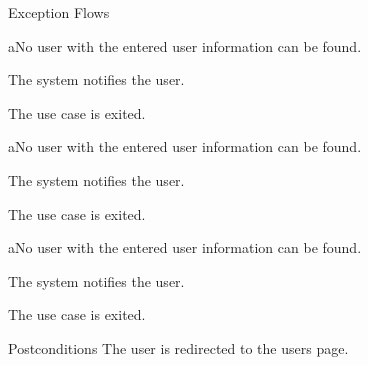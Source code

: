 %
\begin{cpartList}{Exception Flows}
  \begin{innerList}{4}{a}{No user with the entered user information can be found.}
    \item The system notifies the user.
    \item The use case is exited.
  \end{innerList}
  \begin{innerList}{4}{a}{No user with the entered user information can be found.}
    \item The system notifies the user.
    \item The use case is exited.
  \end{innerList}
  \begin{innerList}{4}{a}{No user with the entered user information can be found.}
    \item The system notifies the user.
    \item The use case is exited.
  \end{innerList}
\end{cpartList}

%
\begin{cpart}{Postconditions}
The user is redirected to the users page.
\end{cpart}

